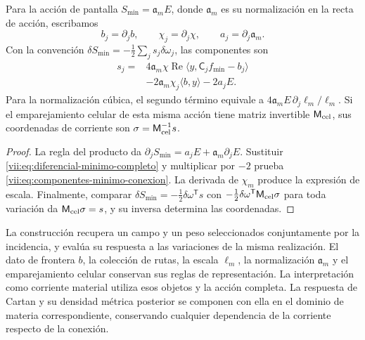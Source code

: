 \begin{theorem}
\label{vii:thm:componentes-minimo-conexion}
Para la acción de pantalla
\(S_{\min}=\mathfrak a_m E\), donde \(\mathfrak a_m\) es su
normalización en la recta de acción, escribamos
\[
 b_j=\partial_jb,\qquad \chi_j=\partial_j\chi,
 \qquad a_j=\partial_j\mathfrak a_m.
\]
Con la convención \(\delta S_{\min}=-\tfrac12\sum_j s_j\delta\omega_j\),
las componentes son
\begin{equation}
 \begin{split}
 s_j={}&4\mathfrak a_m\chi\operatorname{Re}
             \langle y,\mathsf C_jf_{\min}-b_j\rangle\\
      &-2\mathfrak a_m\chi_j\langle b,y\rangle-2a_jE.
 \end{split}
 \label{vii:eq:componentes-minimo-conexion}
\end{equation}
Para la normalización cúbica, el segundo término equivale a
\(4\mathfrak a_m E\,\partial_j\ell_m/\ell_m\).
Si el emparejamiento celular de esta misma acción tiene matriz
invertible \(\mathsf M_{\rm cel}\), sus coordenadas de corriente
son \(\sigma=\mathsf M_{\rm cel}^{-1}s\).
\end{theorem}

\begin{proof}
La regla del producto da
\(\partial_jS_{\min}=a_jE+\mathfrak a_m\partial_jE\).
Sustituir \eqref{vii:eq:diferencial-minimo-completo} y multiplicar
por \(-2\) prueba \eqref{vii:eq:componentes-minimo-conexion}.
La derivada de \(\chi_m\) produce la expresión de escala.
Finalmente, comparar
\(\delta S_{\min}=-\tfrac12\delta\omega^{\mathsf T}s\)
con \(-\tfrac12\delta\omega^{\mathsf T}\mathsf M_{\rm cel}\sigma\)
para toda variación da \(\mathsf M_{\rm cel}\sigma=s\),
y su inversa determina las coordenadas.
\end{proof}

La construcción recupera un campo y un peso seleccionados conjuntamente
por la incidencia, y evalúa su respuesta a las variaciones de la misma
realización. El dato de frontera \(b\), la colección de rutas, la escala
\(\ell_m\), la normalización \(\mathfrak a_m\) y el emparejamiento
celular conservan sus reglas de representación. La interpretación como
corriente material utiliza esos objetos y la acción completa. La
respuesta de Cartan y su densidad métrica posterior se componen con
ella en el dominio de materia correspondiente, conservando cualquier
dependencia de la corriente respecto de la conexión.
